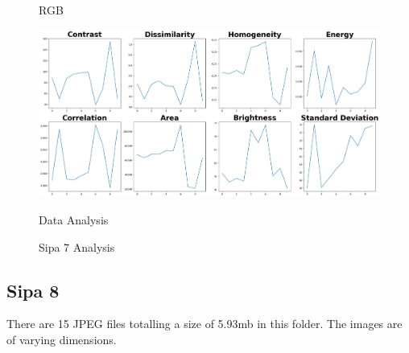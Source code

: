 \begin{figure}[ht]
\begin{minipage}[t]{0.25\textwidth}
        \caption*{RGB}
    \end{minipage}\hfill
    \begin{minipage}[t]{0.50\textwidth}
        \centering
        \includegraphics[width=\textwidth]{Figures/EDA_Charts/7/da.png}
        \caption*{Data Analysis}
    \end{minipage}
    \caption{Sipa 7 Analysis}
    \label{fig:Sipa 7 Analysis}
\end{figure}

\newpage

\subsection{Sipa 8}

There are 15 JPEG files totalling a size of 5.93mb in this folder. The images are of varying dimensions.


